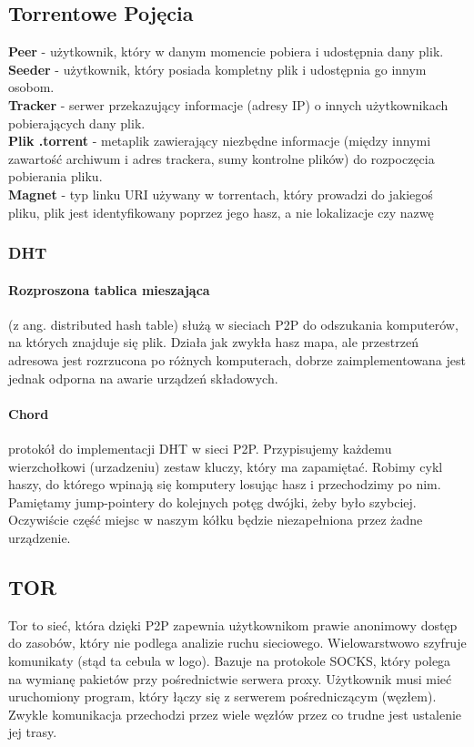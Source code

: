 \documentclass[]{article}
\begin{document}
\subsection{Torrentowe Pojęcia}
\textbf{Peer} - użytkownik, który w danym momencie pobiera i udostępnia dany plik.
\\
\textbf{Seeder} - użytkownik, który posiada kompletny plik i udostępnia go innym osobom.
\\
\textbf{Tracker} - serwer przekazujący informacje (adresy IP) o innych użytkownikach pobierających dany plik.
\\
\textbf{Plik .torrent} - metaplik zawierający niezbędne informacje (między innymi zawartość archiwum i adres trackera, sumy kontrolne plików) do
rozpoczęcia pobierania pliku.
\\
\textbf{Magnet} - typ linku URI używany w torrentach, który prowadzi do jakiegoś pliku, plik jest identyfikowany poprzez jego hasz, a nie lokalizacje czy nazwę
\subsubsection{DHT}
\paragraph{Rozproszona tablica mieszająca} (z ang. distributed hash table) służą w sieciach P2P do odszukania komputerów, na których znajduje się plik. 
Działa jak zwykła hasz mapa, ale przestrzeń adresowa jest rozrzucona po różnych komputerach, dobrze zaimplementowana jest jednak odporna na awarie urządzeń składowych.
\paragraph{Chord} protokół do implementacji DHT w sieci P2P. Przypisujemy każdemu wierzchołkowi (urzadzeniu) zestaw kluczy, który ma zapamiętać. Robimy cykl haszy, do którego wpinają się komputery losując hasz i przechodzimy po nim. Pamiętamy jump-pointery do kolejnych potęg dwójki, żeby było szybciej. Oczywiście część miejsc w naszym kółku będzie niezapełniona przez żadne urządzenie. 
\subsection{TOR}
Tor to sieć, która dzięki P2P zapewnia użytkownikom prawie anonimowy dostęp do zasobów, który nie podlega analizie ruchu sieciowego. Wielowarstwowo szyfruje komunikaty (stąd ta cebula w logo). Bazuje na protokole SOCKS, który polega na wymianę pakietów przy pośrednictwie serwera proxy.  Użytkownik musi mieć uruchomiony program, który łączy się z serwerem pośredniczącym (węzłem). Zwykle komunikacja przechodzi przez wiele węzłów przez co trudne jest ustalenie jej trasy.
\end{document}
